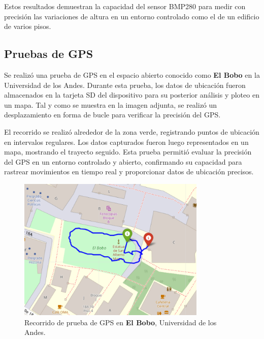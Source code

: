 Estos resultados demuestran la capacidad del sensor BMP280 para medir con precisión las variaciones de altura en un entorno controlado como el de un edificio de varios pisos.



\subsection{Pruebas de GPS}
Se realizó una prueba de GPS en el espacio abierto conocido como \textbf{El Bobo} en la Universidad de los Andes. Durante esta prueba, los datos de ubicación fueron almacenados en la tarjeta SD del dispositivo para su posterior análisis y ploteo en un mapa. Tal y como se muestra en la imagen adjunta, se realizó un desplazamiento en forma de bucle para verificar la precisión del GPS.

El recorrido se realizó alrededor de la zona verde, registrando puntos de ubicación en intervalos regulares. Los datos capturados fueron luego representados en un mapa, mostrando el trayecto seguido. Esta prueba permitió evaluar la precisión del GPS en un entorno controlado y abierto, confirmando su capacidad para rastrear movimientos en tiempo real y proporcionar datos de ubicación precisos.

\begin{figure}[H]
\centering
\includegraphics[width=0.8\textwidth]{Imagenes/Pruebas/gps.png}
\caption{Recorrido de prueba de GPS en \textbf{El Bobo}, Universidad de los Andes.}
\label{fig
}
\end{figure}